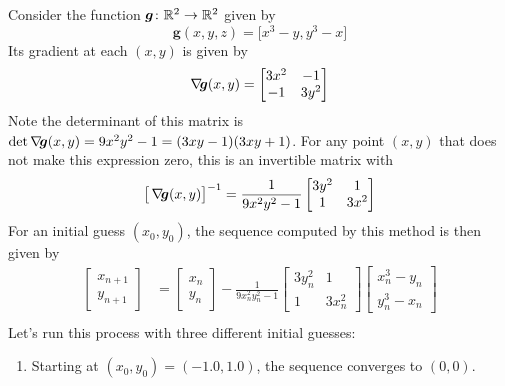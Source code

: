 \begin{example}\label{example:preNewton4poly4}
Consider the function $\boldsymbol{g}\colon \mathbb{R}^2 \to \mathbb{R}^2$ given by
\begin{equation*}
\boldsymbol{g}(x,y,z) = \big[ x^3-y, y^3-x \big]
\end{equation*}
Its gradient at each $(x,y)$ is given by
\begin{equation*}
\mathop{\nabla\! {\boldsymbol{g}}}(x,y) = \begin{bmatrix} 3x^2 & -1 \\ -1 & 3y^2 \end{bmatrix}
\end{equation*}
Note the determinant of this matrix is $\det \mathop{\nabla\! {\boldsymbol{g}}}(x,y) = 9x^2y^2-1 = (3xy-1)(3xy+1)$.  For any point $(x,y)$ that does not make this expression zero, this is an invertible matrix with 
\begin{equation*}
\big[ \mathop{\nabla\! {\boldsymbol{g}}}(x,y)\big]^{-1} = \frac{1}{9x^2y^2-1}\begin{bmatrix} 3y^2 & 1 \\ 1 & 3x^2 \end{bmatrix}
\end{equation*}
For an initial guess $(x_0, y_0)$, the sequence computed by this method is then given by
\begin{align*}
\begin{bmatrix} x_{n+1} \\ y_{n+1} \end{bmatrix} &= \begin{bmatrix} x_n \\ y_n \end{bmatrix} -\frac{1}{9 x_n^2 y_n^2-1}\begin{bmatrix} 3y_n^2 & 1 \\ 1 & 3x_n^2 \end{bmatrix} \begin{bmatrix} x_n^3-y_n \\ y_n^3-x_n \end{bmatrix} \\
\end{align*}
Let's run this process with three different initial guesses:
\begin{enumerate}
	\item Starting at $(x_0, y_0) = (-1.0,1.0)$, the sequence converges to $(0,0)$.  %

\end{enumerate}
\end{example}
